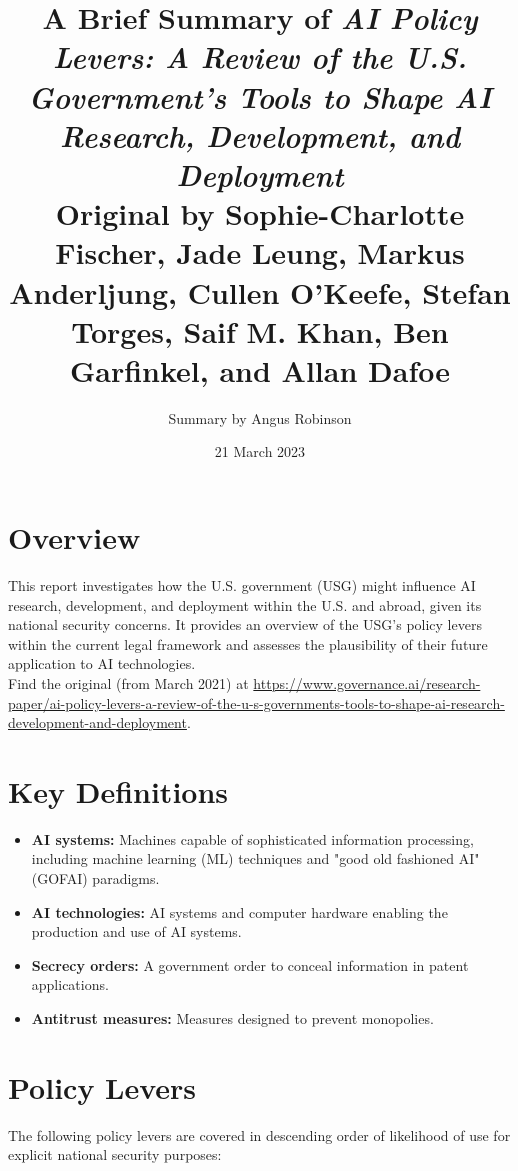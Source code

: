 \documentclass{article}
\title{A Brief Summary of \textit{AI Policy Levers:
A Review of the U.S. Government’s Tools to Shape AI Research, Development, and Deployment} \\ \large Original by Sophie-Charlotte Fischer, Jade Leung, Markus Anderljung, Cullen O’Keefe, Stefan Torges, Saif M. Khan, Ben Garfinkel, and Allan Dafoe }
\author{Summary by Angus Robinson}
\date{21 March 2023}
\begin{document}

\maketitle
\begin{multicols}{2}

\section{Overview}

This report investigates how the U.S. government (USG) might influence AI research, development, and deployment within the U.S. and abroad, given its national security concerns. It provides an overview of the USG's policy levers within the current legal framework and assesses the plausibility of their future application to AI technologies. \\ Find the original (from March 2021) at \href{https://www.governance.ai/research-paper/ai-policy-levers-a-review-of-the-u-s-governments-tools-to-shape-ai-research-development-and-deployment}{https://www.governance.ai/research-paper/ai-policy-levers-a-review-of-the-u-s-governments-tools-to-shape-ai-research-development-and-deployment}.

\section{Key Definitions}

\begin{itemize}
\item \textbf{AI systems:} Machines capable of sophisticated information processing, including machine learning (ML) techniques and "good old fashioned AI" (GOFAI) paradigms.
\item \textbf{AI technologies:} AI systems and computer hardware enabling the production and use of AI systems.
\item \textbf{Secrecy orders:} A government order to conceal information in patent applications.
\item \textbf{Antitrust measures:} Measures designed to prevent monopolies.
\end{itemize}


\section{Policy Levers}

The following policy levers are covered in descending order of likelihood of use for explicit national security purposes:


\end{multicols}
\end{document}

